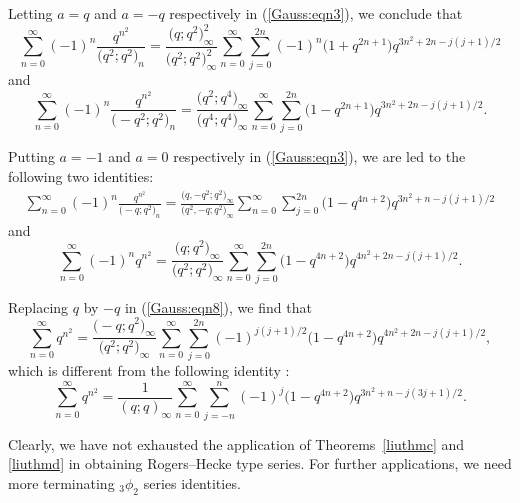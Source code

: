 \documentclass[pdftex]{sigma}
\numberwithin{equation}{section}
\begin{document}
Letting $a=q$ and $a=-q$ respectively in (\ref{Gauss:eqn3}), we conclude that
\begin{equation*}%
\sum_{n=0}^\infty (-1)^n\frac{q^{n^2}}{\bigl(q^2; q^2\bigr)_n}
=\frac{\bigl(q; q^2\bigr)_\infty^2}{\bigl(q^2; q^2\bigr)^2_\infty}
\sum_{n=0}^\infty \sum_{j=0}^{2n} (-1)^n \bigl(1+q^{2n+1}\bigr) q^{3n^2+2n-j(j+1)/2}
\end{equation*}
and
\begin{equation*}%
	\sum_{n=0}^\infty (-1)^n\frac{q^{n^2}}{\bigl(-q^2; q^2\bigr)_n}
	=\frac{\bigl(q^2; q^4\bigr)_\infty }{\bigl(q^4; q^4\bigr)_\infty}
	\sum_{n=0}^\infty \sum_{j=0}^{2n} \bigl(1-q^{2n+1}\bigr) q^{3n^2+2n-j(j+1)/2}.
\end{equation*}

Putting $a=-1$ and $a=0$ respectively in (\ref{Gauss:eqn3}), we are led to the following two identities:
\begin{align*}%
\sum_{n=0}^\infty (-1)^n\frac{q^{n^2}}{\bigl(-q; q^2\bigr)_n}
=\frac{\bigl(q, -q^2; q^2\bigr)_\infty }{\bigl(q^2, -q; q^2\bigr)_\infty}
\sum_{n=0}^\infty \sum_{j=0}^{2n} \bigl(1-q^{4n+2}\bigr) q^{3n^2+n-j(j+1)/2}
\end{align*}
and
\begin{equation}\label{Gauss:eqn8}
\sum_{n=0}^\infty (-1)^n q^{n^2}
=\frac{\bigl(q; q^2\bigr)_\infty}{\bigl(q^2; q^2\bigr)_\infty}
\sum_{n=0}^\infty \sum_{j=0}^{2n} \bigl(1-q^{4n+2}\bigr) q^{4n^2+2n-j(j+1)/2}.
\end{equation}

Replacing $q$ by $-q$ in (\ref{Gauss:eqn8}), we find that
\begin{equation*}%
	\sum_{n=0}^\infty q^{n^2}
	=\frac{\bigl(-q; q^2\bigr)_\infty}{\bigl(q^2; q^2\bigr)_\infty}
	\sum_{n=0}^\infty \sum_{j=0}^{2n} (-1)^{j(j+1)/2}\bigl(1-q^{4n+2}\bigr) q^{4n^2+2n-j(j+1)/2},
\end{equation*}
which is different from the following identity \cite[Proposition~6.11]{Liu2013RamanJ}:
\begin{equation*}%
\sum_{n=0}^\infty q^{n^2}
=\frac{1}{(q; q)_\infty}
\sum_{n=0}^\infty \sum_{j=-n}^{n} (-1)^{j}\bigl(1-q^{4n+2}\bigr) q^{3n^2+n-j(3j+1)/2}.
\end{equation*}

Clearly, we have not exhausted the application of Theorems~\ref{liuthmc} and \ref{liuthmd} in obtaining Rogers--Hecke type series. For further applications,
we need more terminating ${}_3\phi_2$ series identities.
\end{document}
